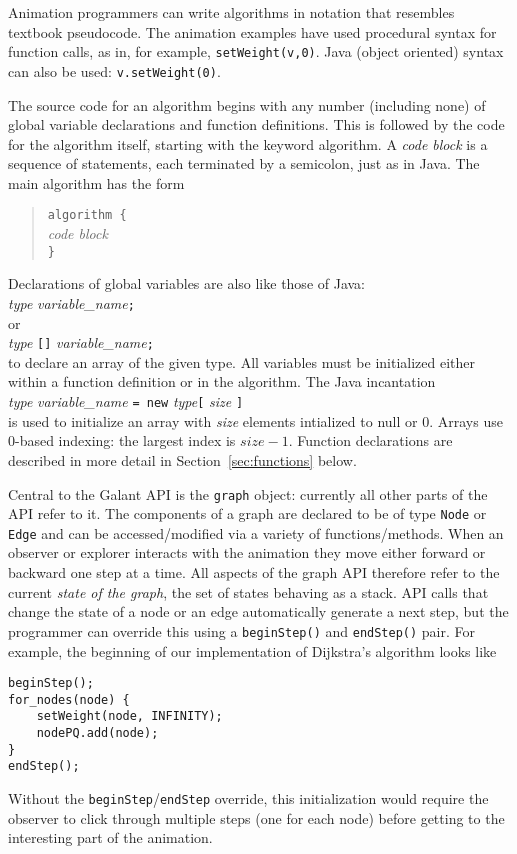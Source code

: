 Animation programmers can write algorithms in notation that resembles
textbook pseudocode.
The animation examples have used procedural syntax for function calls, as in, for example,
\texttt{setWeight(v,0)}.
Java (object oriented) syntax can also be used: \texttt{v.setWeight(0)}.

The source code for an algorithm begins with any number (including none)
of global variable declarations and function definitions.
This is followed by the code for the algorithm itself, starting with the keyword
\textsf{algorithm}.
A \emph{code block}
is a sequence of statements, each terminated by a semicolon, just as in
Java.
The main algorithm has the form
\begin{quote}
\texttt{algorithm \{}\\
\hspace*{2em}\emph{code block}\\
\texttt{\}}
\end{quote}

Declarations of global variables are also like those of Java:\\
\hspace*{1em}\emph{type} \emph{variable\_name}\texttt{;}\\
or\\
\hspace*{1em}\emph{type} \texttt{[]} \emph{variable\_name}\texttt{;}\\
to declare an array of the given type.
All variables must be initialized either within a function definition or
in the algorithm.
The Java incantation\\
\hspace*{1em}\emph{type} \emph{variable\_name}
\texttt{= new} \emph{type}\texttt{[} \emph{size} \texttt{]}\\
is used to initialize an array with \emph{size} elements intialized to \textsf{null}
or 0.
Arrays use 0-based indexing: the largest index is $\mathit{size} - 1$.
Function declarations are described in more detail in Section~\ref{sec:functions}
below.

Central to the Galant API is the \texttt{graph} object: currently all other
parts of the API refer to it.
The components of a graph are declared to be of type \texttt{Node} or
\texttt{Edge} and can be accessed/modified via a variety of
functions/methods.
When an observer or explorer interacts with the animation they move either
forward or backward one step at a time.
All aspects of the graph API therefore refer to the current \emph{state of
  the graph}, the set of states behaving as a stack.
API calls that change the state of a node or an edge automatically
generate a next step,
but the programmer can override this using a \texttt{beginStep()} and
\texttt{endStep()} pair. For example, the beginning of our implementation of
Dijkstra's algorithm looks like
\begin{verbatim}
beginStep();
for_nodes(node) {
    setWeight(node, INFINITY);
    nodePQ.add(node);
}
endStep();
\end{verbatim}
Without the \texttt{beginStep}/\texttt{endStep}
override, this initialization would require the observer to click
through multiple steps (one for each node) before getting to the interesting
part of the animation.

